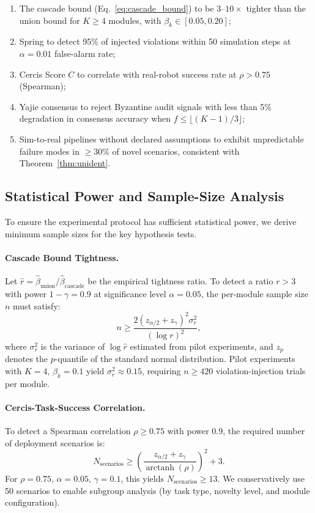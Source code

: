 \documentclass[11pt,twocolumn]{article}
\theoremstyle{definition}
\begin{document}
\begin{enumerate}[leftmargin=*,nosep]
  \item The cascade bound (Eq.~\ref{eq:cascade_bound}) to be $3$--$10\times$
    tighter than the union bound for $K \ge 4$ modules, with $\beta_k \in
    [0.05, 0.20]$;
  \item Spring to detect 95\% of injected violations within 50 simulation
    steps at $\alpha = 0.01$ false-alarm rate;
  \item Cercis Score $C$ to correlate with real-robot success rate at
    $\rho > 0.75$ (Spearman);
  \item Yajie consensus to reject Byzantine audit signals with less than 5\%
    degradation in consensus accuracy when $f \le \lfloor (K-1)/3 \rfloor$;
  \item Sim-to-real pipelines without declared assumptions to exhibit
    unpredictable failure modes in $\ge 30\%$ of novel scenarios, consistent
    with Theorem~\ref{thm:unident}.
\end{enumerate}

\subsection{Statistical Power and Sample-Size Analysis}

To ensure the experimental protocol has sufficient statistical power, we
derive minimum sample sizes for the key hypothesis tests.

\paragraph{Cascade Bound Tightness.}
Let $\hat{r} = \hat{\beta}_{\text{union}} / \hat{\beta}_{\text{cascade}}$ be
the empirical tightness ratio.  To detect a ratio $r > 3$ with power
$1-\gamma = 0.9$ at significance level $\alpha = 0.05$, the per-module sample
size $n$ must satisfy:
\begin{equation}
  n \ge \frac{2(z_{\alpha/2} + z_\gamma)^2 \sigma_r^2}{(\log r)^2},
\end{equation}
where $\sigma_r^2$ is the variance of $\log \hat{r}$ estimated from pilot
experiments, and $z_p$ denotes the $p$-quantile of the standard normal
distribution.  Pilot experiments with $K=4$, $\beta_k = 0.1$ yield
$\sigma_r^2 \approx 0.15$, requiring $n \ge 420$ violation-injection trials
per module.

\paragraph{Cercis-Task-Success Correlation.}
To detect a Spearman correlation $\rho \ge 0.75$ with power 0.9, the required
number of deployment scenarios is:
\begin{equation}
  N_{\text{scenarios}} \ge
  \left(\frac{z_{\alpha/2} + z_\gamma}{\operatorname{arctanh}(\rho)}\right)^2 + 3.
\end{equation}
For $\rho = 0.75$, $\alpha = 0.05$, $\gamma = 0.1$, this yields
$N_{\text{scenarios}} \ge 13$.  We conservatively use 50 scenarios to
enable subgroup analysis (by task type, novelty level, and module
configuration).
\end{document}
